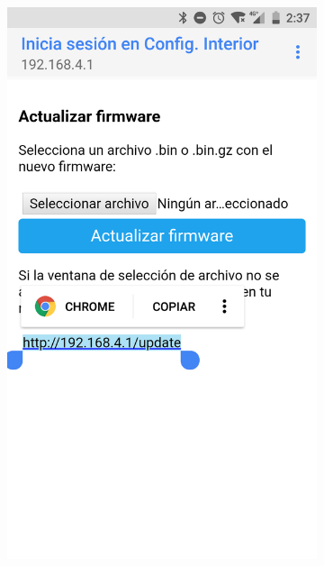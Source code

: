 \begin{figure}
\begin{subfigure}{0.32\columnwidth}
  \centering
  \includegraphics[width=1\columnwidth,frame]{images/interior-firmware-update-selection}
  \caption{}
  \label{fig:interior-firmware-update-selection}
\end{subfigure}
\hfill
\begin{subfigure}{0.32\columnwidth}
  \centering

\end{subfigure}
\end{figure}
